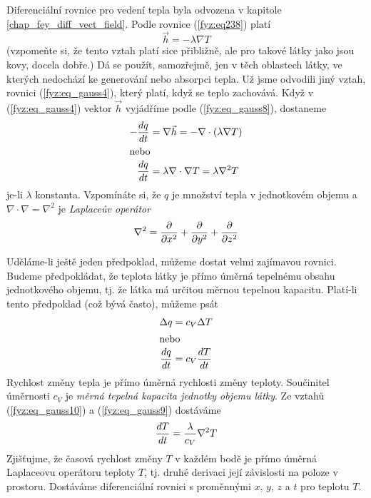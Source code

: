 {      Diferenciální rovnice pro vedení tepla byla odvozena v kapitole 
      \ref{chap_fey_diff_vect_field}. Podle rovnice (\ref{fyz:eq238}) platí
      \begin{equation}\label{fyz:eq_gauss8}
      \vec{h}=-\lambda\nabla T
      \end{equation}    
      (vzpomeňte si, že tento vztah platí sice přibližně, ale pro takové látky jako jsou kovy, 
      docela dobře.) Dá se použít, samozřejmě, jen v těch oblastech látky, ve kterých nedochází ke 
      generování nebo absorpci tepla. Už jsme odvodili jiný vztah, rovnici (\ref{fyz:eq_gauss4}), 
      který platí, když se teplo zachovává. Když v (\ref{fyz:eq_gauss4}) vektor \(\vec{h}\) 
      vyjádříme podle (\ref{fyz:eq_gauss8}), dostaneme
      \begin{align}
        - \frac{d q}{d t} &= \nabla\vec{h} = - \nabla\cdot(\lambda\nabla T)     \nonumber    \\ 
        \intertext{nebo}
          \frac{d q}{d t} &= \lambda\nabla\cdot\nabla T = \lambda\nabla^2 T     \label{fyz:eq_gauss9}
      \end{align}
      je-li \(\lambda\) konstanta. Vzpomínáte si, že \(q\) je množství tepla v jednotkovém objemu a
      \(\nabla\cdot\nabla = \nabla^2\) je \emph{Laplaceův operátor}
      \begin{equation*}
        \nabla^2= \frac{\partial  }{\partial x^2} + \frac{\partial  }{\partial y^2} + \frac{\partial  }{\partial z^2}
      \end{equation*}       
    
      Uděláme-li ještě jeden předpoklad, můžeme dostat velmi zajímavou rovnici. Budeme 
      předpokládat, že teplota látky je přímo úměrná tepelnému obsahu jednotkového objemu, tj. že 
      látka má určitou  měrnou tepelnou kapacitu. Platí-li tento předpoklad (což bývá často), 
      můžeme psát
      \begin{align}
         \Delta q   &= c_V\Delta T                                        \nonumber    \\ 
       \intertext{nebo}
         \frac{d q}{d t} &= c_V\frac{d T}{d t}                                      \label{fyz:eq_gauss10}
      \end{align}    
      Rychlost změny tepla je přímo úměrná rychlosti změny teploty. Součinitel úměrnosti \(c_V\) je 
      \emph{měrná tepelná kapacita jednotky objemu látky}. Ze vztahů (\ref{fyz:eq_gauss10}) a 
      (\ref{fyz:eq_gauss9}) 
      dostáváme
      \begin{equation}\label{fyz:eq_gauss11}
       \frac{d T}{d t} = \frac{\lambda}{c_V}\nabla^2T
      \end{equation}
      Zjišťujme, že časová rychlost změny \(T\) v každém bodě je přímo úměrná Laplaceovu operátoru 
      teploty \(T\), tj. druhé derivaci její závislosti na poloze v prostoru. Dostáváme 
      diferenciální rovnici s proměnnými \(x\), \(y\), \(z\) a \(t\) pro teplotu \(T\).
      
}
